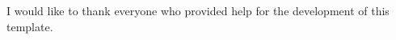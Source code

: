 \begin{acknowledgements}
I would like to thank everyone who provided help for the development of this template.
\end{acknowledgements}